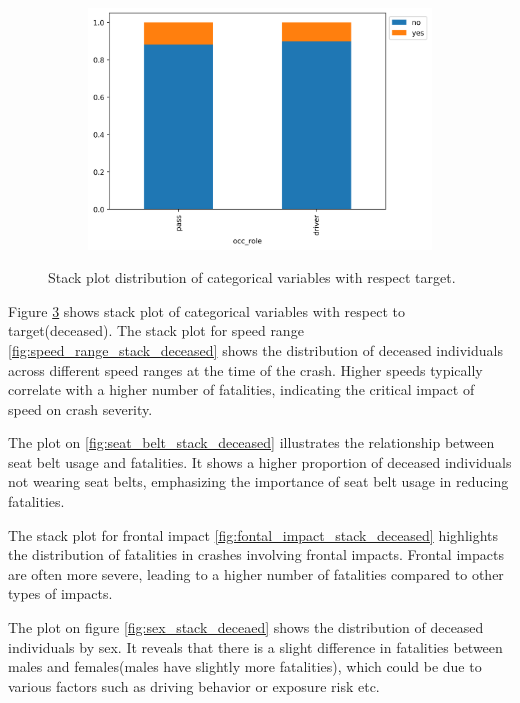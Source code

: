 \documentclass[12pt,a4paper]{article}
\begin{document}
\begin{figure}[h]
\begin{subfigure}[t]{0.32\textwidth}
		\caption{}
		\label{fig:airbag_stack_deceased}
	\end{subfigure}
	\hfill
	\begin{subfigure}[t]{0.33\textwidth}
		\centering
		\includegraphics[width=\textwidth]{occ_role_stack_deceased.png}
		\caption{}
		\label{fig:occ_role_stack_deceased}
	\end{subfigure}
		\caption{Stack plot distribution of categorical variables with respect target.}
		\label{fig:stackplot_wrt_target}
	\end{figure}
Figure \ref{fig:stackplot_wrt_target} shows stack plot of categorical variables with respect to target(deceased). The stack plot for speed range \ref{fig:speed_range_stack_deceased} shows the distribution of deceased individuals across different speed ranges at the time of the crash. Higher speeds typically correlate with a higher number of fatalities, indicating the critical impact of speed on crash severity.

The plot on \ref{fig:seat_belt_stack_deceased} illustrates the relationship between seat belt usage and fatalities. It shows a higher proportion of deceased individuals not wearing seat belts, emphasizing the importance of seat belt usage in reducing fatalities.
 
The stack plot for frontal impact \ref{fig:fontal_impact_stack_deceased} highlights the distribution of fatalities in crashes involving frontal impacts. Frontal impacts are often more severe, leading to a higher number of fatalities compared to other types of impacts.

The plot on figure \ref{fig:sex_stack_deceaed} shows the distribution of deceased individuals by sex. It reveals that there is a slight difference in fatalities between males and females(males have slightly more fatalities), which could be due to various factors such as driving behavior or exposure risk etc.
\end{document}
